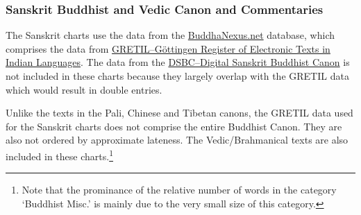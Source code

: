 \newpage
\subsubsection*{Sanskrit Buddhist and Vedic Canon and Commentaries}

The Sanskrit charts use the data from the \href{https://buddhanexus.net}{BuddhaNexus.net} database, which comprises the data from \href{http://gretil.sub.uni-goettingen.de/gretil.html}{GRETIL--Göttingen Register of Electronic Texts in Indian Languages}. The data from the \href{http://www.dsbcproject.org/}{DSBC--Digital Sanskrit Buddhist Canon} is not included in these charts because they largely overlap with the GRETIL data which would result in double entries.

Unlike the texts in the Pali, Chinese and Tibetan canons, the GRETIL data used for the Sanskrit charts does not comprise the entire Buddhist Canon. They are also not ordered by approximate lateness. The Vedic/Brahmanical texts are also included in these charts.\footnote{Note that the prominance of the relative number of words in the category `Buddhist Misc.' is mainly due to the very small size of this category.}

